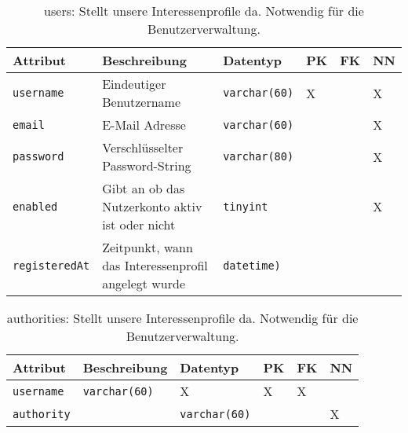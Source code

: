 \begin{table}[!ht]
	\caption{users: Stellt unsere Interessenprofile da. Notwendig für die Benutzerverwaltung.}
    \begin{tabular}{p{3cm}p{5cm}p{2cm}p{1cm}p{1cm}p{1cm}}
    \toprule 
    \textbf{Attribut} & \textbf{Beschreibung} & \textbf{Datentyp} & \textbf{PK} & \textbf{FK} & \textbf{NN} \\
    \hline 
    \texttt{username} & Eindeutiger Benutzername & \texttt{varchar(60)} & X && X   \\
    \texttt{email} &  E-Mail Adresse  & \texttt{varchar(60)} & & & X   \\
    \texttt{password} &  Verschlüsselter Password-String & \texttt{varchar(80)} & & & X  \\
    \texttt{enabled} & Gibt an ob das Nutzerkonto aktiv ist oder nicht   & \texttt{tinyint} & & & X \\
    \texttt{registeredAt} & Zeitpunkt, wann das Interessenprofil angelegt wurde & \texttt{datetime)} & & &   \\
   	\bottomrule
  \end{tabular}
\end{table}

\begin{table}[!ht]
	\caption{authorities: Stellt unsere Interessenprofile da. Notwendig für die Benutzerverwaltung.}
	\begin{tabular}{p{3cm}p{5cm}p{2cm}p{1cm}p{1cm}p{1cm}}
	\toprule 
	\textbf{Attribut} & \textbf{Beschreibung} & \textbf{Datentyp} & \textbf{PK} & \textbf{FK} & \textbf{NN} \\
	\hline 
	\texttt{username} & \texttt{varchar(60)} & X & X & X   \\
	\texttt{authority} &  & \texttt{varchar(60)} & & & X   \\
	\bottomrule
	\end{tabular}
\end{table}

